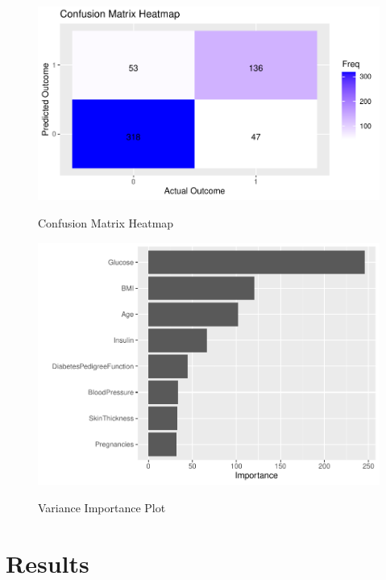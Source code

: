\documentclass[12pt]{article}
\begin{document}
  \begin{figure}[tbp]
      \centering
      \caption{Confusion Matrix Heatmap}
      \includegraphics[width=\textwidth]{Confusion Matrix Heatmap.pdf}
      \label{fig:Heatmap}
      \end{figure}
  
  \begin{figure}[tbp]
    \centering
    \caption{Variance Importance Plot}
    \includegraphics[width=\textwidth]{Variance Important.pdf}
    \label{fig:importance}
  \end{figure}

\section{Results}
\label{sec:resu}
\end{document}
